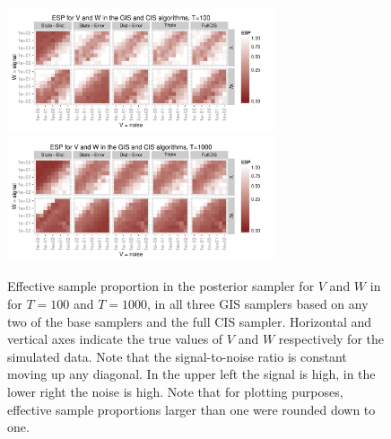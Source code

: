 \documentclass{article}
\begin{document}
\begin{figure}[!ht]
\centering
\includegraphics[width=0.7\textwidth]{intESplot1}
\includegraphics[width=0.7\textwidth]{intESplot2}
\caption{Effective sample proportion in the posterior sampler for $V$ and $W$ in for $T=100$ and $T=1000$, in all three GIS samplers based on any two of the base samplers and the full CIS sampler. Horizontal and vertical axes indicate the true values of $V$ and $W$ respectively for the simulated data. Note that the signal-to-noise ratio is constant moving up any diagonal. In the upper left the signal is high, in the lower right the noise is high. Note that for plotting purposes, effective sample proportions larger than one were rounded down to one.}
\label{intESplot}
\end{figure}
\end{document}

